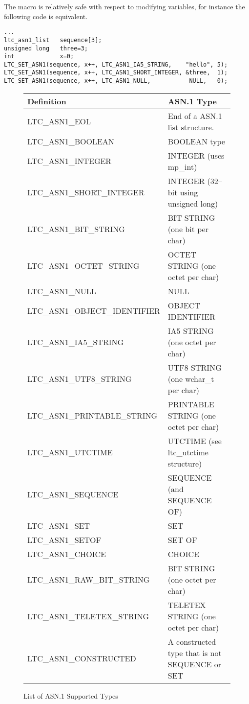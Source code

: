 \documentclass[synpaper]{book}
\begin{document}
The macro is relatively safe with respect to modifying variables, for instance the following code is equivalent.

\begin{small}
\begin{verbatim}
...
ltc_asn1_list   sequence[3];
unsigned long   three=3;
int             x=0;
LTC_SET_ASN1(sequence, x++, LTC_ASN1_IA5_STRING,    "hello", 5);
LTC_SET_ASN1(sequence, x++, LTC_ASN1_SHORT_INTEGER, &three,  1);
LTC_SET_ASN1(sequence, x++, LTC_ASN1_NULL,           NULL,   0);
\end{verbatim}
\end{small}

\begin{figure}[here]
\begin{center}
\begin{small}
\begin{tabular}{|l|l|}
\hline \textbf{Definition}           & \textbf{ASN.1 Type} \\
\hline LTC\_ASN1\_EOL                & End of a ASN.1 list structure. \\
\hline LTC\_ASN1\_BOOLEAN            & BOOLEAN type \\
\hline LTC\_ASN1\_INTEGER            & INTEGER (uses mp\_int) \\
\hline LTC\_ASN1\_SHORT\_INTEGER     & INTEGER (32--bit using unsigned long) \\
\hline LTC\_ASN1\_BIT\_STRING        & BIT STRING (one bit per char) \\
\hline LTC\_ASN1\_OCTET\_STRING      & OCTET STRING (one octet per char) \\
\hline LTC\_ASN1\_NULL               & NULL \\
\hline LTC\_ASN1\_OBJECT\_IDENTIFIER & OBJECT IDENTIFIER  \\
\hline LTC\_ASN1\_IA5\_STRING        & IA5 STRING (one octet per char) \\
\hline LTC\_ASN1\_UTF8\_STRING       & UTF8 STRING (one wchar\_t per char) \\
\hline LTC\_ASN1\_PRINTABLE\_STRING  & PRINTABLE STRING (one octet per char) \\
\hline LTC\_ASN1\_UTCTIME            & UTCTIME (see ltc\_utctime structure) \\
\hline LTC\_ASN1\_SEQUENCE           & SEQUENCE (and SEQUENCE OF) \\
\hline LTC\_ASN1\_SET                & SET \\
\hline LTC\_ASN1\_SETOF              & SET OF \\
\hline LTC\_ASN1\_CHOICE             & CHOICE \\
\hline LTC\_ASN1\_RAW\_BIT\_STRING   & BIT STRING (one octet per char) \\
\hline LTC\_ASN1\_TELETEX\_STRING    & TELETEX STRING (one octet per char) \\
\hline LTC\_ASN1\_CONSTRUCTED        & A constructed type that is not SEQUENCE or SET \\
\hline
\end{tabular}
\caption{List of ASN.1 Supported Types}
\end{small}
\end{center}
\end{figure}
\end{document}
